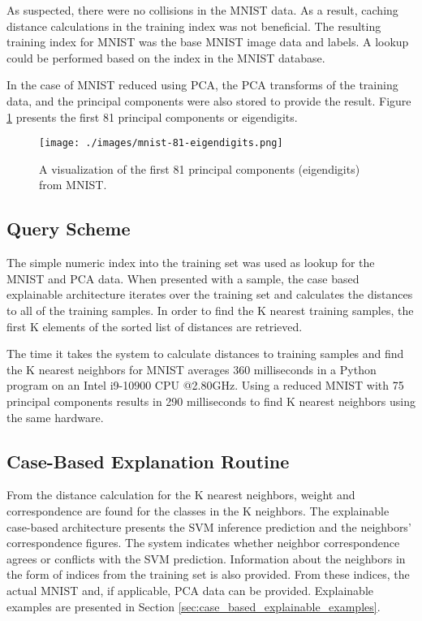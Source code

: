 As suspected, there were no collisions in the MNIST data. As a result, caching
distance calculations in the training index was not beneficial. The resulting
training index for MNIST was the base MNIST image data and labels. A lookup
could be performed based on the index in the MNIST database.

In the case of MNIST reduced using PCA, the PCA transforms of the training data,
and the principal components were also stored to provide the result. Figure
\ref{fig:mnist_eigendigits} presents the first 81 principal components or
eigendigits.

\begin{figure}[H]
    \centerline{\texttt{[image: ./images/mnist-81-eigendigits.png]}}
    \caption{A visualization of the first 81 principal components (eigendigits) from MNIST.}
    \label{fig:mnist_eigendigits}
\end{figure}


\subsection{Query Scheme}

The simple numeric index into the training set was used as lookup for the MNIST
and PCA data. When presented with a sample, the case based explainable
architecture iterates over the training set and calculates the distances to all
of the training samples. In order to find the K nearest training samples, the
first K elements of the sorted list of distances are retrieved.

The time it takes the system to calculate distances to training samples and find
the K nearest neighbors for MNIST averages 360 milliseconds in a Python program
on an Intel i9-10900 CPU @2.80GHz. Using a reduced MNIST with 75 principal
components results in 290 milliseconds to find K nearest neighbors using the
same hardware.

\subsection{Case-Based Explanation Routine}

From the distance calculation for the K nearest neighbors, weight and
correspondence are found for the classes in the K neighbors. The explainable
case-based architecture presents the SVM inference prediction and the neighbors'
correspondence figures. The system indicates whether neighbor correspondence
agrees or conflicts with the SVM prediction. Information about the neighbors in
the form of indices from the training set is also provided. From these indices,
the actual MNIST and, if applicable, PCA data can be provided. Explainable
examples are presented in Section \ref{sec:case_based_explainable_examples}.

